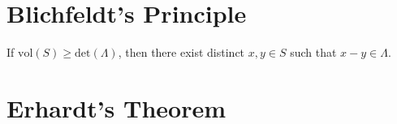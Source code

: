 \section{Blichfeldt's Principle}

\begin{theorem}
  If $\mathrm{vol}(S)\geq\mathrm{det}(\Lambda)$, then there exist distinct $x,y\in S$ such that $x-y\in\Lambda$.
\end{theorem}

\section{Erhardt's Theorem}

